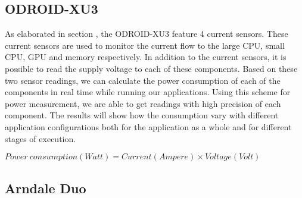 \subsection{ODROID-XU3}
As elaborated in section , the ODROID-XU3 feature 4 current sensors.
These current sensors are used to monitor the current flow to the large CPU, small CPU, GPU and memory respectively.
In addition to the current sensors, it is possible to read the supply voltage to each of these components.
Based on these two sensor readings, we can calculate the power consumption of each of the components in real time while running our applications.
Using this scheme for power measurement, we are able to get readings with high precision of each component.
The results will show how the consumption vary with different application configurations both for the application as a whole and for different stages of execution.

$ Power\ consumption (Watt) = Current (Ampere) \times Voltage (Volt) $

\subsection{Arndale Duo}

